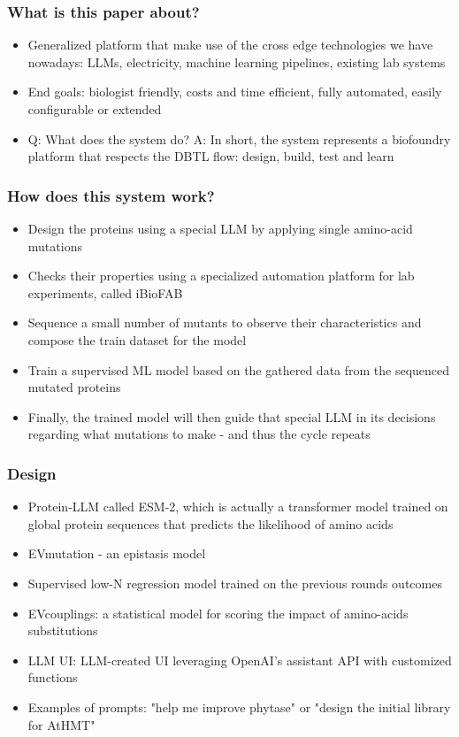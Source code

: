 \documentclass[11pt]{beamer}
\begin{document}
	\begin{frame}
		\frametitle{What is this paper about?}
		\begin{itemize}
			\item Generalized platform that make use of the cross edge technologies we have nowadays: LLMs, electricity, machine learning pipelines, existing lab systems
			\item End goals: biologist friendly, costs and time efficient, fully automated, easily configurable or extended
			\item Q: What does the system do? A: In short, the system represents a biofoundry platform that respects the DBTL flow: design, build, test and learn
		\end{itemize}
	\end{frame}
	\begin{frame}
		\frametitle{How does this system work?}
		\begin{itemize}
			\item Design the proteins using a special LLM by applying single amino-acid mutations
			\item Checks their properties using a specialized automation platform for lab experiments, called iBioFAB
			\item Sequence a small number of mutants to observe their characteristics and compose the train dataset for the model
			\item Train a supervised ML model based on the gathered data from the sequenced mutated proteins
			\item Finally, the trained model will then guide that special LLM in its decisions regarding what mutations to make - and thus the cycle repeats
		\end{itemize}
	\end{frame}
	\begin{frame}
		\frametitle{Design}
		\begin{itemize}
			\item Protein-LLM called ESM-2, which is actually a transformer model trained on global protein sequences that predicts the likelihood of amino acids
			\item EVmutation - an epistasis model
			\item Supervised low-N regression model trained on the previous rounds outcomes
			\item EVcouplings: a statistical model for scoring the impact of amino-acids substitutions
			\item LLM UI: LLM-created UI leveraging OpenAI’s assistant API with customized functions
			\item Examples of prompts: "help me improve phytase" or "design the initial library for AtHMT"
		\end{itemize}
	\end{frame}
\end{document}

